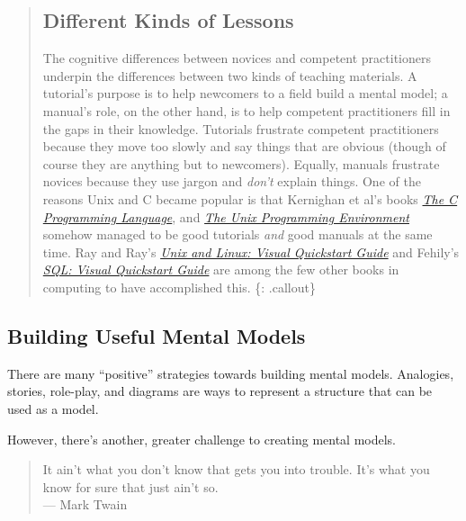 \begin{quote}
\subsection{Different Kinds of Lessons}\label{different-kinds-of-lessons}

The cognitive differences between novices and competent practitioners
underpin the differences between two kinds of teaching materials. A
tutorial's purpose is to help newcomers to a field build a mental model;
a manual's role, on the other hand, is to help competent practitioners
fill in the gaps in their knowledge. Tutorials frustrate competent
practitioners because they move too slowly and say things that are
obvious (though of course they are anything but to newcomers). Equally,
manuals frustrate novices because they use jargon and \emph{don't}
explain things. One of the reasons Unix and C became popular is that
Kernighan et al's books
\emph{\href{http://www.amazon.com/Programming-Language-Brian-W-Kernighan/dp/0131103628/}{The
C Programming Language}}, and
\emph{\href{http://www.amazon.com/Unix-Programming-Environment-Prentice-Hall-Software/dp/013937681X/}{The
Unix Programming Environment}} somehow managed to be good tutorials
\emph{and} good manuals at the same time. Ray and Ray's
\emph{\href{http://www.amazon.com/Unix-Linux-Visual-QuickStart-Guide/dp/0321997549/}{Unix
and Linux: Visual Quickstart Guide}} and Fehily's
\emph{\href{http://www.amazon.com/SQL-Visual-QuickStart-Guide-3rd/dp/0321553578/}{SQL:
Visual Quickstart Guide}} are among the few other books in computing to
have accomplished this. \{: .callout\}
\end{quote}

\subsection{Building Useful Mental
Models}\label{building-useful-mental-models}

There are many ``positive'' strategies towards building mental models.
Analogies, stories, role-play, and diagrams are ways to represent a
structure that can be used as a model.

However, there's another, greater challenge to creating mental models.

\begin{quote}
It ain't what you don't know that gets you into trouble. It's what you
know for sure that just ain't so.\\--- Mark Twain
\end{quote}

